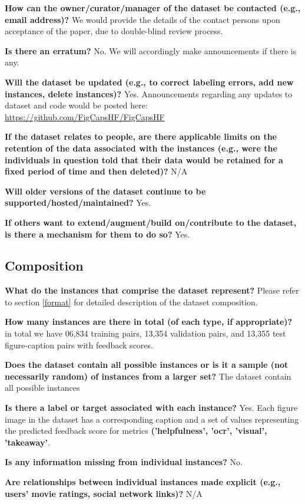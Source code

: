 \documentclass[11pt]{article}
\begin{document}
\textbf{How can the owner/curator/manager of the dataset be contacted (e.g., email address)?} We would provide the details of the contact persons upon acceptance of the paper, due to double-blind review process.

\textbf{Is there an erratum?} No. We will accordingly make announcements if there is any.

\textbf{Will the dataset be updated (e.g., to correct labeling errors, add new instances, delete instances)?} Yes. Announcements regarding any updates to dataset and code would be posted here: \url{https://github.com/FigCapsHF/FigCapsHF}

\textbf{If the dataset relates to people, are there applicable limits on the retention of the data associated with the instances (e.g., were the individuals in question told that their data would be retained for a fixed period of time and then deleted)?} N/A

\textbf{Will older versions of the dataset continue to be supported/hosted/maintained?} Yes.

\textbf{If others want to extend/augment/build on/contribute to the dataset, is there a mechanism for them to do so?} Yes. 

\subsection{Composition}

\textbf{What do the instances that comprise the dataset represent?} Please refer to section \ref{format} for detailed description of the dataset composition.

\textbf{How many instances are there in total (of each type, if appropriate)?} in total we have 06,834 training pairs, 13,354 validation pairs, and 13,355 test figure-caption pairs with feedback scores.

\textbf{Does the dataset contain all possible instances or is it a sample (not necessarily random) of
instances from a larger set?} The dataset contain all possible instances

\textbf{Is there a label or target associated with each instance?} Yes. Each figure image in the dataset has a corresponding caption and a set of values representing the predicted feedback score for metrics \textbf{('helpfulness', 'ocr', 'visual', 'takeaway'}.

\textbf{Is any information missing from individual instances?} No.

\textbf{Are relationships between individual instances made explicit (e.g., users’ movie ratings, social network links)?}  N/A
\end{document}
